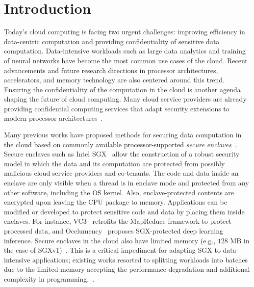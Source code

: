 \section{Introduction}\label{sec:introduction}

Today's cloud computing is facing two urgent challenges: improving efficiency in data-centric computation and providing confidentiality of sensitive data computation. Data-intensive workloads such as large data analytics and training of neural networks have become the most common use cases of the cloud. Recent advancements and future research directions in processor architectures, accelerators, and memory technology are also centered around this trend. Ensuring the confidentiality of the computation in the cloud is another agenda shaping the future of cloud computing. Many cloud service providers are already providing confidential computing services that adapt security extensions to modern processor architectures~\cite{google-confidential-computing,azure,nitro}.


Many previous works have proposed methods for securing data computation in the cloud based on commonly available processor-supported \emph{secure enclaves}~\cite{vc3,occulemency,oblivious-ml}. Secure enclaves such as Intel SGX~\cite{sgx} allow the construction of a robust security model in which the data and its computation are protected from possibly malicious cloud service providers and co-tenants. The code and data inside an enclave are only visible when a thread is in enclave mode and protected from any other software, including the OS kernel. Also, enclave-protected contents are encrypted upon leaving the CPU package to memory. Applications can be modified or developed to protect sensitive code and data by placing them inside enclaves. For instance, VC3~\cite{vc3} retrofits the MapReduce framework to protect processed data, and Occlumency~\cite{occulemency} proposes SGX-protected deep learning inference. Secure enclaves in the cloud also have limited memory (e.g., $128$ MB in the case of SGXv1)~\cite{costan_intel_2016}. This is a critical impediment for adapting SGX to data-intensive applications; existing works resorted to splitting workloads into batches due to the limited memory accepting the performance degradation and additional complexity in programming.~\cite{occulemency,bigmatrix}.



